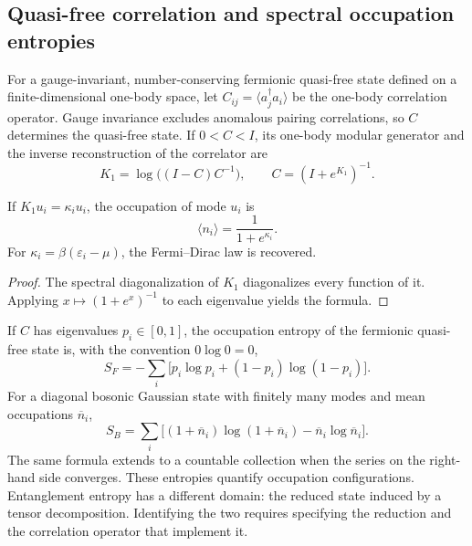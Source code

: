 \subsection{Quasi-free correlation and spectral occupation entropies}
\label{v:rec:cuasilibre:section:01}

For a gauge-invariant, number-conserving fermionic quasi-free state
defined on a finite-dimensional one-body space, let
\(C_{ij}=\langle a_j^\dagger a_i\rangle\) be the one-body correlation
operator. Gauge invariance excludes anomalous pairing
correlations, so \(C\) determines the quasi-free state. If
\(0<C<I\), its one-body modular generator and the inverse reconstruction
of the correlator are
\begin{equation}
 \boxed{
 K_1=\log\bigl((I-C)C^{-1}\bigr),
 \qquad
 C=(I+e^{K_1})^{-1}.}
 \label{v:rec:eq:puente-cuasilibre-modular-rev3}
\end{equation}

\begin{corollary}
\label{v:rec:cor:forma-logistica-modular-rev3}
If \(K_1u_i=\kappa_i u_i\), the occupation of mode \(u_i\) is
\[
 \langle n_i\rangle=\frac1{1+e^{\kappa_i}}.
\]
For \(\kappa_i=\beta(\varepsilon_i-\mu)\), the Fermi--Dirac law
is recovered.
\end{corollary}

\begin{proof}
The spectral diagonalization of \(K_1\) diagonalizes every function of it.
Applying \(x\mapsto(1+e^x)^{-1}\) to each eigenvalue yields the formula.
\end{proof}

If \(C\) has eigenvalues \(p_i\in[0,1]\), the occupation entropy of the
fermionic quasi-free state is, with the convention \(0\log0=0\),
\begin{equation}
 S_F=-\sum_i\bigl[p_i\log p_i+(1-p_i)\log(1-p_i)\bigr].
 \label{v:rec:eq:entropia-cuasilibre-fermi-rev3}
\end{equation}
For a diagonal bosonic Gaussian state with finitely many modes and
mean occupations \(\overline n_i\),
\begin{equation}
 S_B=\sum_i\bigl[(1+\overline n_i)\log(1+\overline n_i)
                  -\overline n_i\log\overline n_i\bigr].
 \label{v:rec:eq:entropia-gaussiana-bose-rev3}
\end{equation}
The same formula extends to a countable collection when the series on the
right-hand side converges.
These entropies quantify occupation configurations. Entanglement
entropy has a different domain: the reduced state induced by a
tensor decomposition. Identifying the two requires specifying the
reduction and the correlation operator that implement it.


